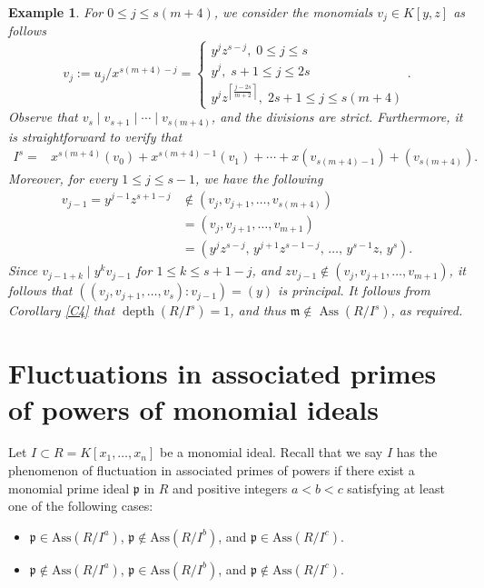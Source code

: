 \documentclass[11pt]{amsart}
\newtheorem{example}[theorem]{Example}
\def\Ass{\operatorname{Ass}}
\def\depth{\operatorname{depth}}
\begin{document}
\begin{example}
{For $0\leq j\leq s(m+4)$,  we consider the monomials $v_j\in K[y,z]$ as follows
$$v_j:=u_j/x^{s(m+4)-j}=\begin{cases} y^j z^{s-j},\;0\leq j\leq s \\
 y^j, \;s+1 \leq j\leq 2s \\ y^jz^{\left\lceil \frac{j-2s}{m+2}\right\rceil} , \;2s+1 \leq j\leq s(m+4) \end{cases}.$$
Observe  that $v_{s}\mid v_{s+1}\mid \cdots \mid v_{s(m+4)}$, and the divisions are strict. 
  Furthermore, it is straightforward to verify that 
\[
\begin{aligned}
I^{s}={}&x^{s(m+4)}(v_0)+x^{s(m+4)-1}(v_1)+\cdots+x(v_{s(m+4)-1})+(v_{s(m+4)}).
\end{aligned}
\]
Moreover, for every $1\leq j\leq s-1$, we have the following 
\[
\begin{aligned}
v_{j-1}=y^{j-1}z^{s+1-j}
&\notin (v_j,v_{j+1},\ldots,v_{s(m+4)})\\
&=(v_j,v_{j+1},\ldots,v_{m+1})\\
&=(y^jz^{s-j},\,y^{j+1}z^{s-1-j},\,\ldots,\,y^{s-1}z,\,y^{s}).
\end{aligned}
\]
Since $v_{j-1+k} \mid y^{k}v_{j-1}$ for $1\leq k\leq s+1-j$, and $zv_{j-1}\notin (v_j,v_{j+1},\ldots,v_{m+1})$, it
follows that  $((v_j,v_{j+1},\ldots,v_{s}):v_{j-1})=(y)$  is principal. 
 It follows from  Corollary \ref{C4} that  $\depth(R/I^{s})=1$, and thus $\mathfrak m\notin \Ass(R/I^{s})$, as required.
 }
\end{example}

 
 
 



\section{Fluctuations in  associated primes of powers of monomial ideals}\label{Section5}

Let $I\subset R=K[x_1, \ldots, x_n]$ be a monomial ideal.  Recall that  we say  $I$ has the phenomenon of fluctuation in associated primes of 
powers if there exist  a monomial prime ideal $\mathfrak{p}$ in $R$  and  positive integers $a<b<c$ satisfying  at least one of the following cases:
\begin{itemize}
\item[(i)] $\mathfrak{p} \in \mathrm{Ass}(R/I^a)$, $\mathfrak{p} \notin \mathrm{Ass}(R/I^b)$, and $\mathfrak{p} \in \mathrm{Ass}(R/I^c)$. 
\item[(ii)] $\mathfrak{p} \notin \mathrm{Ass}(R/I^a)$, $\mathfrak{p} \in \mathrm{Ass}(R/I^b)$, and $\mathfrak{p} \notin \mathrm{Ass}(R/I^c)$.
\end{itemize}
\end{document}
